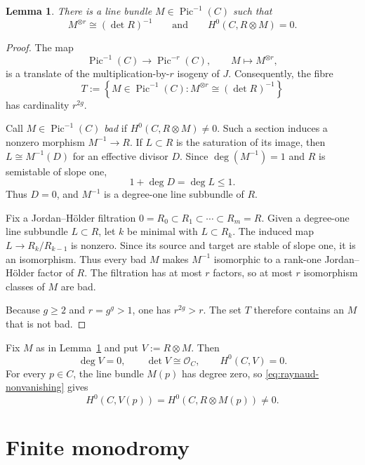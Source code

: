 \documentclass[10pt,a4paper,reqno]{amsart}
\newtheorem{lemma}[theorem]{Lemma}
\theoremstyle{remark}
\newcommand{\OO}{\mathcal{O}}
\newcommand{\tens}{\otimes}
\DeclareMathOperator{\Pic}{Pic}
\begin{document}
\begin{lemma}\label{lem:twist}
There is a line bundle $M\in\Pic^{-1}(C)$ such that
\begin{equation}\label{eq:choice-M}
  M^{\tens r}\cong(\det R)^{-1}
  \qquad\text{and}\qquad
  H^0(C,R\tens M)=0.
\end{equation}
\end{lemma}

\begin{proof}
The map
\[
  \Pic^{-1}(C)\longrightarrow\Pic^{-r}(C),
  \qquad
  M\longmapsto M^{\tens r},
\]
is a translate of the multiplication-by-$r$ isogeny of $J$.  Consequently,
the fibre
\[
  T:=\left\{M\in\Pic^{-1}(C):M^{\tens r}\cong(\det R)^{-1}\right\}
\]
has cardinality $r^{2g}$.

Call $M\in\Pic^{-1}(C)$ \emph{bad} if $H^0(C,R\tens M)\neq 0$.  Such a
section induces a nonzero morphism $M^{-1}\to R$.  If $L\subset R$ is the
saturation of its image, then $L\cong M^{-1}(D)$ for an effective divisor
$D$.  Since $\deg(M^{-1})=1$ and $R$ is semistable of slope one,
\[
  1+\deg D=\deg L\leq 1.
\]
Thus $D=0$, and $M^{-1}$ is a degree-one line subbundle of $R$.

Fix a Jordan--H\"older filtration
$0=R_0\subset R_1\subset\cdots\subset R_m=R$.  Given a degree-one line
subbundle $L\subset R$, let $k$ be minimal with $L\subset R_k$.  The induced
map $L\to R_k/R_{k-1}$ is nonzero.  Since its source and target are stable of
slope one, it is an isomorphism.  Thus every bad $M$ makes $M^{-1}$
isomorphic to a rank-one Jordan--H\"older factor of $R$.  The filtration has
at most $r$ factors, so at most $r$ isomorphism classes of $M$ are bad.

Because $g\geq 2$ and $r=g^g>1$, one has $r^{2g}>r$.  The set $T$ therefore
contains an $M$ that is not bad.
\end{proof}

Fix $M$ as in Lemma~\ref{lem:twist} and put $V:=R\tens M$.  Then
\begin{equation}\label{eq:V-properties}
  \deg V=0,
  \qquad
  \det V\cong\OO_C,
  \qquad
  H^0(C,V)=0.
\end{equation}
For every $p\in C$, the line bundle $M(p)$ has degree zero, so
\eqref{eq:raynaud-nonvanishing} gives
\begin{equation}\label{eq:V-pointwise}
  H^0(C,V(p))=H^0(C,R\tens M(p))\neq 0.
\end{equation}

\section{Finite monodromy}
\end{document}
